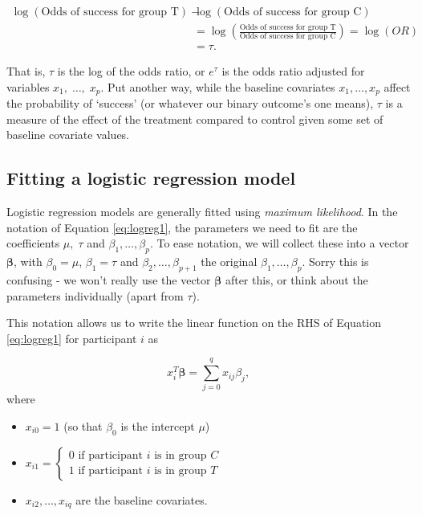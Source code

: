 \documentclass[
  openany]{book}
\providecommand{\tightlist}{%
  \setlength{\itemsep}{0pt}\setlength{\parskip}{0pt}}
\theoremstyle{definition}
\theoremstyle{definition}
\theoremstyle{definition}
\theoremstyle{definition}
\theoremstyle{remark}
\begin{document}
\[
\begin{aligned}
\log(\text{Odds of success for group T}) - & \log(\text{Odds of success for group C})\\
&= 
\log\left(\frac{\text{Odds of success for group T}}{\text{Odds of success for group C}}\right) = \log\left(OR\right) \\
&= \tau.
\end{aligned}
\]

That is, \(\tau\) is the log of the odds ratio, or \(e^\tau\) is the odds ratio adjusted for variables \(x_1,\;\ldots,\;x_p\). Put another way, while the baseline covariates \(x_1,\ldots,x_p\) affect the probability of `success' (or whatever our binary outcome's one means), \(\tau\) is a measure of the effect of the treatment compared to control given some set of baseline covariate values.

\hypertarget{fitting-a-logistic-regression-model}{%
\subsection{Fitting a logistic regression model}\label{fitting-a-logistic-regression-model}}

Logistic regression models are generally fitted using \emph{maximum likelihood}. In the notation of Equation \eqref{eq:logreg1}, the parameters we need to fit are the coefficients \(\mu,\;\tau\) and \(\beta_1,\ldots,\beta_p\). To ease notation, we will collect these into a vector \(\boldsymbol\beta\), with \(\beta_0=\mu\), \(\beta_1=\tau\) and \(\beta_2,\ldots,\beta_{p+1}\) the original \(\beta_1,\ldots,\beta_p\). Sorry this is confusing - we won't really use the vector \(\boldsymbol\beta\) after this, or think about the parameters individually (apart from \(\tau\)).

This notation allows us to write the linear function on the RHS of Equation \eqref{eq:logreg1} for participant \(i\) as

\[x_i^T\boldsymbol\beta = \sum\limits_{j=0}^{q} x_{ij}\beta_j, \]
where

\begin{itemize}
\tightlist
\item
  \(x_{i0}=1\) (so that \(\beta_0\) is the intercept \(\mu\))
\item
  \(x_{i1}=  \begin{cases}  0\text{ if participant }i\text{ is in group }C\\  1\text{ if participant }i\text{ is in group }T  \end{cases}\)
\item
  \(x_{i2},\ldots,x_{iq}\) are the baseline covariates.
\end{itemize}
\end{document}

